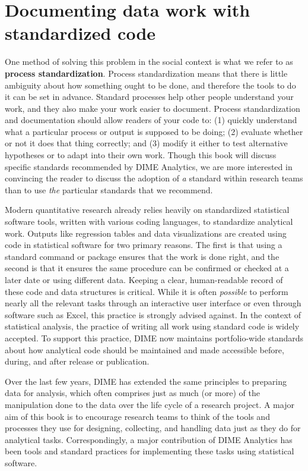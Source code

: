 \section{Documenting data work with standardized code}

One method of solving this problem in the social context
is what we refer to as \textbf{process standardization}.
Process standardization means that there is
little ambiguity about how something ought to be done,
and therefore the tools to do it can be set in advance.
Standard processes help other people understand your work,
and they also make your work easier to document.
Process standardization and documentation should allow readers of your code to:
(1) quickly understand what a particular process or output is supposed to be doing;
(2) evaluate whether or not it does that thing correctly; and
(3) modify it either to test alternative hypotheses or to adapt into their own work.
Though this book will discuss specific standards recommended by DIME Analytics,
we are more interested in convincing the reader
to discuss the adoption of \textit{a} standard within research teams
than to use \textit{the} particular standards that we recommend.

Modern quantitative research already relies heavily
on standardized statistical software tools,
written with various coding languages, to standardize analytical work.
Outputs like regression tables and data visualizations
are created using code in statistical software for two primary reasons.
The first is that using a standard command or package ensures that the work is done right,
and the second is that it ensures the same procedure can be confirmed or checked
at a later date or using different data.
Keeping a clear, human-readable record of these code and data structures is critical.
While it is often \textit{possible} to perform nearly all the relevant tasks
through an interactive user interface or even through software such as Excel,
this practice is strongly advised against.
In the context of statistical analysis,
the practice of writing all work using standard code is widely accepted.
To support this practice, DIME now maintains portfolio-wide standards
about how analytical code should be maintained and made accessible
before, during, and after release or publication.

Over the last few years, DIME has extended the same principles to preparing data for analysis,
which often comprises just as much (or more) of the manipulation done to the data
over the life cycle of a research project.
A major aim of this book is to encourage research teams
to think of the tools and processes they use
for designing, collecting, and handling data
just as they do for analytical tasks.
Correspondingly, a major contribution of DIME Analytics
has been tools and standard practices
for implementing these tasks using statistical software.

